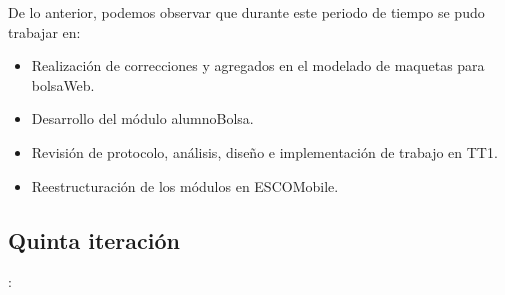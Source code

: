 \newline
De lo anterior, podemos observar que durante este periodo de tiempo se pudo trabajar en:
\begin{itemize}
	\item Realización de correcciones y agregados en el modelado de maquetas para bolsaWeb.
	\item Desarrollo del módulo alumnoBolsa.
	\item Revisión de protocolo, análisis, diseño e implementación de trabajo en TT1.
	\item Reestructuración de los módulos en ESCOMobile.
\end{itemize}


\subsection{Quinta iteración}: 

